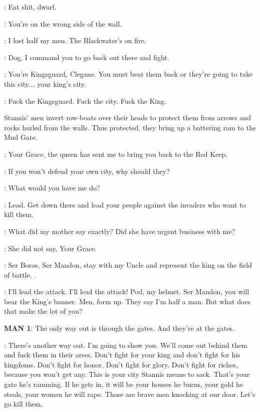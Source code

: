 \HOUND: Eat shit, dwarf. 

\TYRION: You're on the wrong side of the wall. 

\HOUND: I lost half my men. 
The Blackwater's on fire. 

\JOFFREY:  Dog, I command you to go back out there and fight. 

\TYRION: You're Kingsguard, Clegane. 
You must beat them back or they're going to take this city$\ldots$ your king's city. 

\HOUND: Fuck the Kingsguard. 
Fuck the city. 
Fuck the King. 

\n Stannis' men invert row-boats over their heads to protect them from
arrows and rocks hurled from the walls. Thus protected, they bring up
a battering ram to the Mud Gate.


\LANCEL: Your Grace, the queen has sent me to bring you back to the Red Keep. 

\TYRION: If you won't defend your own city, why should they? 

\JOFFREY: What would you have me do? 

\TYRION: Lead. 
Get down there and lead your people against the invaders who want to kill them. 

\JOFFREY: What did my mother say exactly? 
Did she have urgent business with me? 

\LANCEL: She did not say, Your Grace. 

\JOFFREY: Ser Boros, Ser Mandon, stay with my Uncle and represent the
king on the field of battle. .


\TYRION:  I'll lead the attack. 
 I'll lead the attack! 
Pod, my helmet. 
Ser Mandon, you will bear the King's banner. 
Men, form up. 
They say I'm half a man. 
But what does that make the lot of you? 

\textbf{MAN 1}: The only way out is through the gates. 
And they're at the gates. 

\TYRION: There's another way out. I'm going to show you. 
We'll come out behind them and fuck them in their arses.  Don't fight
for your king and don't fight for his kingdoms.  Don't fight for
honor.  Don't fight for glory.  Don't fight for riches, because you
won't get any.  This is your city Stannis means to sack.  That's your
gate he's ramming.  If he gets in, it will be your houses he burns,
your gold he steals, your women he will rape.  Those are brave men
knocking at our door.  Let's go kill them.

